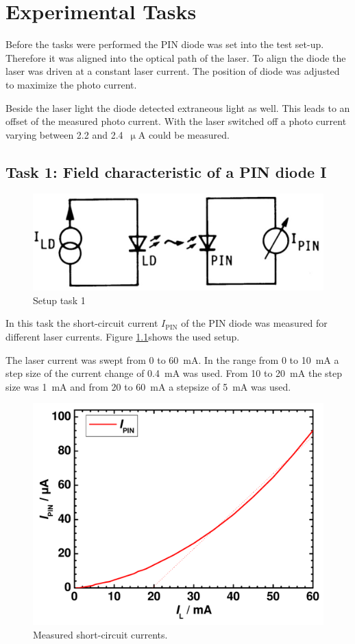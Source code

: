 \chapter{Experimental Tasks}

Before the tasks were performed the PIN diode was set into the test set-up. Therefore it was aligned into the optical path of the laser. To align the diode the laser was driven at a constant laser current. The position of diode was adjusted to maximize the photo current. 


Beside the laser light the diode detected extraneous light as well. This leads to an offset of the measured photo current. With the laser switched off a photo current varying between 2.2 and 2.4~$\upmu$A could be measured.

\section{Task 1: Field characteristic of a PIN diode I}
\label{T1}
\begin{figure}%
\centering
\includegraphics[width=.5\columnwidth]{Grafiken/T1_setup.jpg}%
\caption{Setup task 1}%
\label{fig:T1_setup}%
\end{figure}
In this task the short-circuit current $I_{\mathrm{PIN}}$ of the PIN diode was measured for different laser currents. Figure \ref{fig:T1_setup}\footnotemark[1] shows the used setup. 

The laser current was swept from 0 to 60~mA. In the range from 0 to 10~mA a step size of the current change of 0.4~mA was used. From 10 to 20~mA the step size was 1~mA and from 20 to 60~mA a stepsize of 5~mA was used. 

\begin{figure}%
\centering
\includegraphics[width=.5\columnwidth]{Grafiken/T1_laser.pdf}%
\caption{Measured short-circuit currents.}%
\label{fig:T1_laser}%
\end{figure}

